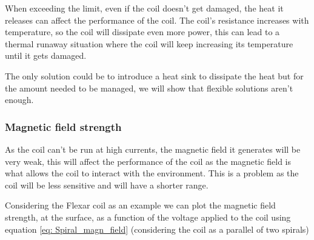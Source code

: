 \begin{center}
\end{center}

When exceeding the limit, even if the coil doesn't get damaged, the heat it releases can affect the performance of the coil. The coil's resistance increases with temperature, so the coil will dissipate even more power, this can lead to a thermal runaway situation where the coil will keep increasing its temperature until it gets damaged.

The only solution could be to introduce a heat sink to dissipate the heat but for the amount needed to be managed, we will show that flexible solutions aren't enough.

\subsubsection{Magnetic field strength}
As the coil can't be run at high currents, the magnetic field it generates will be very weak, this will affect the performance of the coil as the magnetic field is what allows the coil to interact with the environment. This is a problem as the coil will be less sensitive and will have a shorter range.

Considering the Flexar coil as an example we can plot the magnetic field strength, at the surface, as a function of the voltage applied to the coil using equation \eqref{eq: Spiral_magn_field} (considering the coil as a parallel of two spirals)


